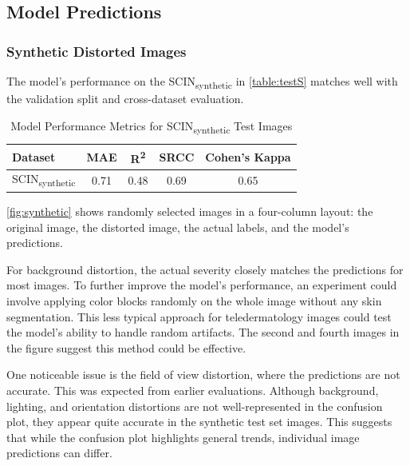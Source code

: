 \subsection{Model Predictions}
\label{sub:4}
\subsubsection{Synthetic Distorted Images}
The model’s performance on the SCIN\textsubscript{synthetic} in \autoref{table:testS} matches well with the validation split and cross-dataset evaluation. \par
\begin{table}[ht]
    \centering
    \begin{tabular}{|l|c|c|c|c|}
        \hline
        \textbf{Dataset} & \textbf{MAE} & \textbf{R\textsuperscript{2}} & \textbf{SRCC} & \textbf{Cohen's Kappa} \\
        \hline
        SCIN\textsubscript{synthetic} & 0.71 & 0.48 & 0.69 & 0.65 \\
        \hline
    \end{tabular}
    \caption{Model Performance Metrics for SCIN\textsubscript{synthetic} Test Images}
    \label{table:testS}
\end{table}
\vspace{\baselineskip}
\noindent
\autoref{fig:synthetic} shows randomly selected images in a four-column layout: the original image, the distorted image, the actual labels, and the model’s predictions. \par
\vspace{\baselineskip}
\noindent
For background distortion, the actual severity closely matches the predictions for most images. To further improve the model’s performance, an experiment could involve applying color blocks randomly on the whole image without any skin segmentation. This less typical approach for teledermatology images could test the model’s ability to handle random artifacts. The second and fourth images in the figure suggest this method could be effective. \par
\vspace{\baselineskip}
\noindent
One noticeable issue is the field of view distortion, where the predictions are not accurate. This was expected from earlier evaluations. Although background, lighting, and orientation distortions are not well-represented in the confusion plot, they appear quite accurate in the synthetic test set images. This suggests that while the confusion plot highlights general trends, individual image predictions can differ. \par
